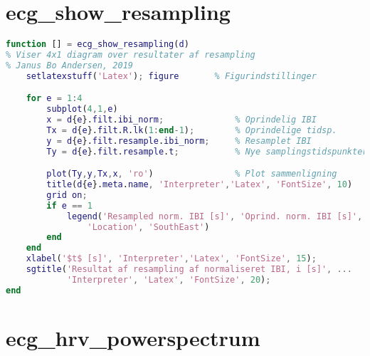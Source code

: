 \documentclass[a4paper]{report}
\begin{document}
\section{ecg\_show\_resampling}

        
\begin{lstlisting}[language=Matlab, style=Matlab-editor]
function [] = ecg_show_resampling(d)
% Viser 4x1 diagram over resultater af resampling
% Janus Bo Andersen, 2019
    setlatexstuff('Latex'); figure       % Figurindstillinger

    for e = 1:4
        subplot(4,1,e)
        x = d{e}.filt.ibi_norm;              % Oprindelig IBI
        Tx = d{e}.filt.R.lk(1:end-1);        % Oprindelige tidsp.
        y = d{e}.filt.resample.ibi_norm;     % Resamplet IBI
        Ty = d{e}.filt.resample.t;           % Nye samplingstidspunkter

        plot(Ty,y,Tx,x, 'ro')                % Plot sammenligning
        title(d{e}.meta.name, 'Interpreter','Latex', 'FontSize', 10)
        grid on;
        if e == 1
            legend('Resampled norm. IBI [s]', 'Oprind. norm. IBI [s]', ...
                'Location', 'SouthEast')
        end
    end
    xlabel('$t$ [s]', 'Interpreter','Latex', 'FontSize', 15);
    sgtitle('Resultat af resampling af normaliseret IBI, i [s]', ...
            'Interpreter', 'Latex', 'FontSize', 20);
end
\end{lstlisting}



\section{ecg\_hrv\_powerspectrum}
\end{document}
